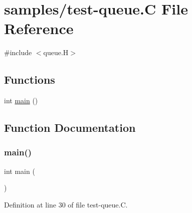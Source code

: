 \hypertarget{test-queue_8_c}{}\section{samples/test-\/queue.C File Reference}
\label{test-queue_8_c}
{\ttfamily \#include $<$queue.\+H$>$}\newline
\subsection*{Functions}
\begin{DoxyCompactItemize}
\item 
int \hyperlink{test-queue_8_c_ae66f6b31b5ad750f1fe042a706a4e3d4}{main} ()
\end{DoxyCompactItemize}


\subsection{Function Documentation}
\mbox{\label{test-queue_8_c_ae66f6b31b5ad750f1fe042a706a4e3d4}} 
\subsubsection{\texorpdfstring{main()}{main()}}
{\footnotesize\ttfamily int main (\begin{DoxyParamCaption}{ }\end{DoxyParamCaption})}



Definition at line 30 of file test-\/queue.\+C.

